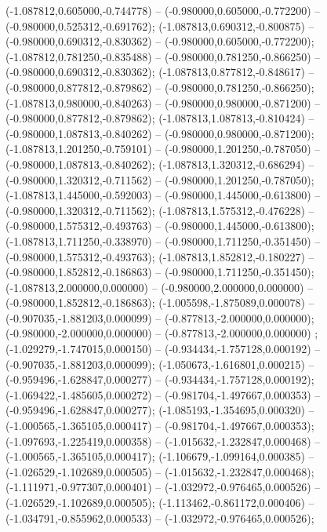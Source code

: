  (-1.087812,0.605000,-0.744778) -- (-0.980000,0.605000,-0.772200) -- (-0.980000,0.525312,-0.691762);
 (-1.087813,0.690312,-0.800875) -- (-0.980000,0.690312,-0.830362) -- (-0.980000,0.605000,-0.772200);
 (-1.087812,0.781250,-0.835488) -- (-0.980000,0.781250,-0.866250) -- (-0.980000,0.690312,-0.830362);
 (-1.087813,0.877812,-0.848617) -- (-0.980000,0.877812,-0.879862) -- (-0.980000,0.781250,-0.866250);
 (-1.087813,0.980000,-0.840263) -- (-0.980000,0.980000,-0.871200) -- (-0.980000,0.877812,-0.879862);
 (-1.087813,1.087813,-0.810424) -- (-0.980000,1.087813,-0.840262) -- (-0.980000,0.980000,-0.871200);
 (-1.087813,1.201250,-0.759101) -- (-0.980000,1.201250,-0.787050) -- (-0.980000,1.087813,-0.840262);
 (-1.087813,1.320312,-0.686294) -- (-0.980000,1.320312,-0.711562) -- (-0.980000,1.201250,-0.787050);
 (-1.087813,1.445000,-0.592003) -- (-0.980000,1.445000,-0.613800) -- (-0.980000,1.320312,-0.711562);
 (-1.087813,1.575312,-0.476228) -- (-0.980000,1.575312,-0.493763) -- (-0.980000,1.445000,-0.613800);
 (-1.087813,1.711250,-0.338970) -- (-0.980000,1.711250,-0.351450) -- (-0.980000,1.575312,-0.493763);
 (-1.087813,1.852812,-0.180227) -- (-0.980000,1.852812,-0.186863) -- (-0.980000,1.711250,-0.351450);
 (-1.087813,2.000000,0.000000) -- (-0.980000,2.000000,0.000000) -- (-0.980000,1.852812,-0.186863);
 (-1.005598,-1.875089,0.000078) -- (-0.907035,-1.881203,0.000099) -- (-0.877813,-2.000000,0.000000);
 (-0.980000,-2.000000,0.000000) -- (-0.877813,-2.000000,0.000000) ;
 (-1.029279,-1.747015,0.000150) -- (-0.934434,-1.757128,0.000192) -- (-0.907035,-1.881203,0.000099);
 (-1.050673,-1.616801,0.000215) -- (-0.959496,-1.628847,0.000277) -- (-0.934434,-1.757128,0.000192);
 (-1.069422,-1.485605,0.000272) -- (-0.981704,-1.497667,0.000353) -- (-0.959496,-1.628847,0.000277);
 (-1.085193,-1.354695,0.000320) -- (-1.000565,-1.365105,0.000417) -- (-0.981704,-1.497667,0.000353);
 (-1.097693,-1.225419,0.000358) -- (-1.015632,-1.232847,0.000468) -- (-1.000565,-1.365105,0.000417);
 (-1.106679,-1.099164,0.000385) -- (-1.026529,-1.102689,0.000505) -- (-1.015632,-1.232847,0.000468);
 (-1.111971,-0.977307,0.000401) -- (-1.032972,-0.976465,0.000526) -- (-1.026529,-1.102689,0.000505);
 (-1.113462,-0.861172,0.000406) -- (-1.034791,-0.855962,0.000533) -- (-1.032972,-0.976465,0.000526);
